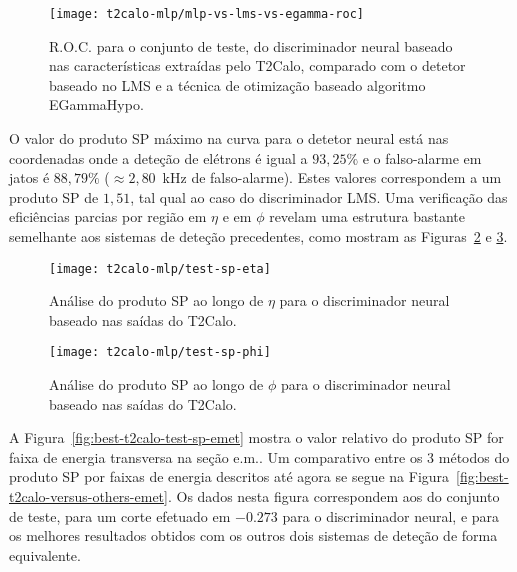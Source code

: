 \begin{figure}
\begin{center}
\texttt{[image: t2calo-mlp/mlp-vs-lms-vs-egamma-roc]}
\end{center}
\caption{R.O.C. para o conjunto de teste, do discriminador neural baseado nas
características extraídas pelo T2Calo, comparado com o detetor baseado no LMS
e a técnica de otimização baseado algoritmo EGammaHypo.}
\label{fig:best-t2calo-test-roc}
\end{figure}

O valor do produto SP máximo na curva para o detetor neural está nas
coordenadas onde a deteção de elétrons é igual a $93,25\%$ e o falso-alarme em
jatos é $88,79\%$ ($\approx 2,80$~kHz de falso-alarme). Estes valores
correspondem a um produto SP de $1,51$, tal qual ao caso do discriminador
LMS. Uma verificação das eficiências parcias por região em $\eta$ e em $\phi$
revelam uma estrutura bastante semelhante aos sistemas de deteção precedentes,
como mostram as Figuras~\ref{fig:best-t2calo-test-sp-eta} e
\ref{fig:best-t2calo-test-sp-phi}. 

\begin{figure}
\begin{center}
\texttt{[image: t2calo-mlp/test-sp-eta]}
\end{center}
\caption{Análise do produto SP ao longo de $\eta$ para o discriminador neural
baseado nas saídas do T2Calo.}
\label{fig:best-t2calo-test-sp-eta}
\end{figure}

\begin{figure}
\begin{center}
\texttt{[image: t2calo-mlp/test-sp-phi]}
\end{center}
\caption{Análise do produto SP ao longo de $\phi$ para o discriminador neural
baseado nas saídas do T2Calo.}
\label{fig:best-t2calo-test-sp-phi}
\end{figure}

A Figura~\ref{fig:best-t2calo-test-sp-emet} mostra o valor relativo do produto
SP for faixa de energia transversa na seção e.m.. Um comparativo entre os 3
métodos do produto SP por faixas de energia descritos até agora se segue
na Figura~\ref{fig:best-t2calo-versus-others-emet}. Os dados nesta figura
correspondem aos do conjunto de teste, para um corte efetuado em $-0.273$ para
o discriminador neural, e para os melhores resultados obtidos com os outros
dois sistemas de deteção de forma equivalente.

